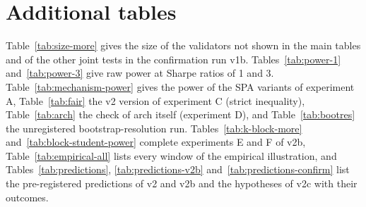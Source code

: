 



\section{Additional tables}
\label{app:tables}

Table~\ref{tab:size-more} gives the size of the validators not shown in the main tables and of the other joint tests in the confirmation run v1b. Tables~\ref{tab:power-1} and~\ref{tab:power-3} give raw power at Sharpe ratios of 1 and 3. Table~\ref{tab:mechanism-power} gives the power of the SPA variants of experiment A, Table~\ref{tab:fair} the v2 version of experiment C (strict inequality), Table~\ref{tab:arch} the check of arch itself (experiment D), and Table~\ref{tab:bootres} the unregistered bootstrap-resolution run. Tables~\ref{tab:k-block-more} and~\ref{tab:block-student-power} complete experiments E and F of v2b, Table~\ref{tab:empirical-all} lists every window of the empirical illustration, and Tables~\ref{tab:predictions}, \ref{tab:predictions-v2b} and~\ref{tab:predictions-confirm} list the pre-registered predictions of v2 and v2b and the hypotheses of v2c with their outcomes.



